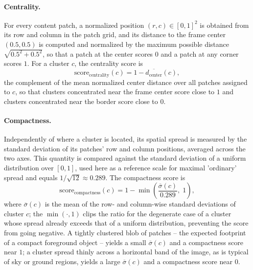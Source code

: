 \paragraph{Centrality.} For every content patch, a normalized position $(r,c) \in [0,1]^2$ is obtained from its row and column in the patch grid, and its distance to the frame center $(0.5, 0.5)$ is computed and normalized by the maximum possible distance $\sqrt{0.5^2+0.5^2}$, so that a patch at the center scores $0$ and a patch at any corner scores $1$. For a cluster $c$, the centrality score is
\[
\text{score}_{\text{centrality}}(c) = 1 - \overline{d_{\text{center}}}(c),
\]
the complement of the mean normalized center distance over all patches assigned to $c$, so that clusters concentrated near the frame center score close to $1$ and clusters concentrated near the border score close to $0$.

\paragraph{Compactness.} Independently of where a cluster is located, its spatial spread is measured by the standard deviation of its patches' row and column positions, averaged across the two axes. This quantity is compared against the standard deviation of a uniform distribution over $[0,1]$, used here as a reference scale for maximal 'ordinary' spread and equals $1/\sqrt{12} \approx 0.289$. The compactness score is
\[
\text{score}_{\text{compactness}}(c) = 1 - \min\!\left(\frac{\overline{\sigma}(c)}{0.289},\; 1\right),
\]
where $\overline{\sigma}(c)$ is the mean of the row- and column-wise standard deviations of cluster $c$; the $\min(\cdot, 1)$ clips the ratio for the degenerate case of a cluster whose spread already exceeds that of a uniform distribution, preventing the score from going negative. A tightly clustered blob of patches -- the expected footprint of a compact foreground object -- yields a small $\overline{\sigma}(c)$ and a compactness score near $1$; a cluster spread thinly across a horizontal band of the image, as is typical of sky or ground regions, yields a large $\overline{\sigma}(c)$ and a compactness score near $0$.

